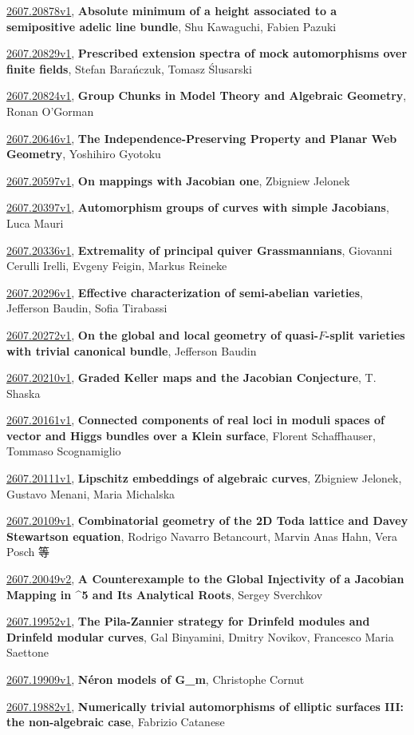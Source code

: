 \documentclass[9pt, a4paper]{article}
\theoremstyle{plain}
\theoremstyle{definition}
\theoremstyle{remark}
\newcommand{\arxiv}[3]{\href{https://arxiv.org/abs/#1}{#1}, \textbf{\textcolor{arxivblue}{#2}}, #3}
\begin{document}
\arxiv{2607.20878v1}{Absolute minimum of a height associated to a semipositive adelic line bundle}{Shu Kawaguchi, Fabien Pazuki}

\arxiv{2607.20829v1}{Prescribed extension spectra of mock automorphisms over finite fields}{Stefan Barańczuk, Tomasz Ślusarski}

\arxiv{2607.20824v1}{Group Chunks in Model Theory and Algebraic Geometry}{Ronan O'Gorman}

\arxiv{2607.20646v1}{The Independence-Preserving Property and Planar Web Geometry}{Yoshihiro Gyotoku}

\arxiv{2607.20597v1}{On mappings with Jacobian one}{Zbigniew Jelonek}

\arxiv{2607.20397v1}{Automorphism groups of curves with simple Jacobians}{Luca Mauri}

\arxiv{2607.20336v1}{Extremality of principal quiver Grassmannians}{Giovanni Cerulli Irelli, Evgeny Feigin, Markus Reineke}

\arxiv{2607.20296v1}{Effective characterization of semi-abelian varieties}{Jefferson Baudin, Sofia Tirabassi}

\arxiv{2607.20272v1}{On the global and local geometry of quasi-$F$-split varieties with trivial canonical bundle}{Jefferson Baudin}

\arxiv{2607.20210v1}{Graded Keller maps and the Jacobian Conjecture}{T. Shaska}

\arxiv{2607.20161v1}{Connected components of real loci in moduli spaces of vector and Higgs bundles over a Klein surface}{Florent Schaffhauser, Tommaso Scognamiglio}

\arxiv{2607.20111v1}{Lipschitz embeddings of algebraic curves}{Zbigniew Jelonek, Gustavo Menani, Maria Michalska}

\arxiv{2607.20109v1}{Combinatorial geometry of the 2D Toda lattice and Davey Stewartson equation}{Rodrigo Navarro Betancourt, Marvin Anas Hahn, Vera Posch 等}

\arxiv{2607.20049v2}{A Counterexample to the Global Injectivity of a Jacobian Mapping in \mathbb{C}^5 and Its Analytical Roots}{Sergey Sverchkov}

\arxiv{2607.19952v1}{The Pila-Zannier strategy for Drinfeld modules and Drinfeld modular curves}{Gal Binyamini, Dmitry Novikov, Francesco Maria Saettone}

\arxiv{2607.19909v1}{N{é}ron models of G\_m}{Christophe Cornut}

\arxiv{2607.19882v1}{Numerically trivial automorphisms of elliptic surfaces III: the non-algebraic case}{Fabrizio Catanese}
\end{document}
